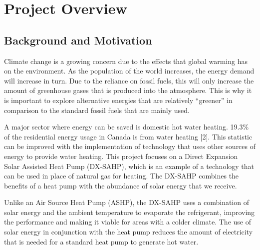 \chapter{Project Overview}

\section{Background and Motivation}

Climate change is a growing concern due to the effects that global warming has on the environment. As the population of the world increases, the energy demand will increase in turn. Due to the reliance on fossil fuels, this will only increase the amount of greenhouse gases that is produced into the atmosphere. This is why it is important to explore alternative energies that are relatively “greener” in comparison to the standard fossil fuels that are mainly used.

\medskip
A major sector where energy can be saved is domestic hot water heating. 19.3\% of the residential energy usage in Canada is from water heating [2]. This statistic can be improved with the implementation of technology that uses other sources of energy to provide water heating. This project focuses on a Direct Expansion Solar Assisted Heat Pump (DX-SAHP), which is an example of a technology that can be used in place of natural gas for heating. The DX-SAHP combines the benefits of a heat pump with the abundance of solar energy that we receive.

\medskip
Unlike an Air Source Heat Pump (ASHP), the DX-SAHP uses a combination of solar energy and the ambient temperature to evaporate the refrigerant, improving the performance and making it viable for areas with a colder climate. The use of solar energy in conjunction with the heat pump reduces the amount of electricity that is needed for a standard heat pump to generate hot water.

